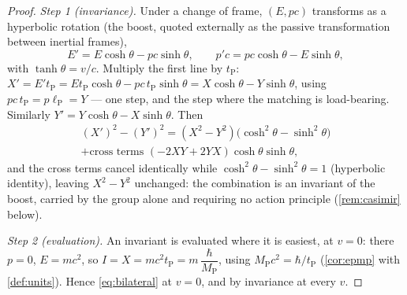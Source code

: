 \documentclass[11pt]{amsbook}
\theoremstyle{plain}
\theoremstyle{definition}
\theoremstyle{remark}
\begin{document}
\begin{proof}
\emph{Step 1 (invariance).} Under a change of frame, $(E, pc)$ transforms as a hyperbolic rotation (the boost, quoted externally as the passive transformation between inertial frames),
\begin{equation}\label{eq:boost-quotes}
E' = E\cosh\theta - pc\sinh\theta, \qquad p'c = pc\cosh\theta - E\sinh\theta,
\end{equation}
with $\tanh\theta = v/c$. Multiply the first line by $t_{\mathrm P}$: $X' = E't_{\mathrm P} = E t_{\mathrm P}\cosh\theta - pc\,t_{\mathrm P}\sinh\theta = X\cosh\theta - Y\sinh\theta$, using $pc\,t_{\mathrm P} = p\ell_{\mathrm P} = Y$ --- one step, and the step where the matching is load-bearing. Similarly $Y' = Y\cosh\theta - X\sinh\theta$. Then
\begin{equation}\label{eq:casimir-inv}
\begin{gathered}
(X')^{2} - (Y')^{2} = (X^{2} - Y^{2})\bigl(\cosh^{2}\theta - \sinh^{2}\theta\bigr)\\
+ \text{cross terms } (-2XY + 2YX)\cosh\theta\sinh\theta,
\end{gathered}
\end{equation}
and the cross terms cancel identically while $\cosh^{2}\theta - \sinh^{2}\theta = 1$ (hyperbolic identity), leaving $X^{2} - Y^{2}$ unchanged: the combination is an invariant of the boost, carried by the group alone and requiring no action principle (\cref{rem:casimir} below).

\emph{Step 2 (evaluation).} An invariant is evaluated where it is easiest, at $v = 0$: there $p = 0$, $E = mc^{2}$, so $I = X = mc^{2}t_{\mathrm P} = m\,\dfrac{\hbar}{M_{\mathrm P}}$, using $M_{\mathrm P}c^{2} = \hbar/t_{\mathrm P}$ (\cref{cor:epmp} with \cref{def:units}). Hence \cref{eq:bilateral} at $v = 0$, and by invariance at every $v$.
\end{proof}
\end{document}
